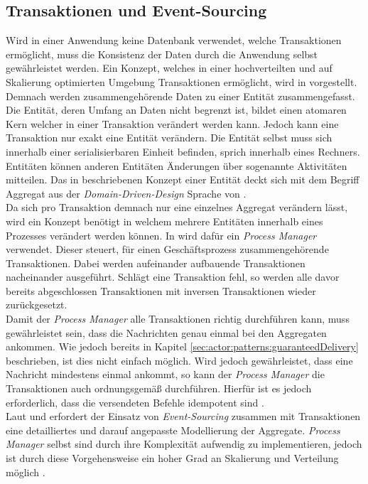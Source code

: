 \subsection{Transaktionen und Event-Sourcing}
Wird in einer Anwendung keine Datenbank verwendet, welche Transaktionen ermöglicht, muss die Konsistenz der Daten durch die Anwendung selbst gewährleistet werden. Ein Konzept, welches in einer hochverteilten und auf Skalierung optimierten Umgebung Transaktionen ermöglicht, wird in \cite{helland2007life} vorgestellt. Demnach werden zusammengehörende Daten zu einer Entität zusammengefasst. Die Entität, deren Umfang an Daten nicht begrenzt ist, bildet einen atomaren Kern welcher in einer Transaktion verändert werden kann. Jedoch kann eine Transaktion nur exakt eine Entität verändern. Die Entität selbst muss sich innerhalb einer serialisierbaren Einheit befinden, sprich innerhalb eines Rechners. Entitäten können anderen Entitäten Änderungen über sogenannte Aktivitäten mitteilen. Das in \cite{helland2007life} beschriebenen Konzept einer Entität deckt sich mit dem Begriff Aggregat aus der \textit{Domain-Driven-Design} Sprache von \cite{Evans2004Domain-drivenSoftware}. \\
Da sich pro Transaktion demnach nur eine einzelnes Aggregat verändern lässt, wird ein Konzept benötigt in welchem mehrere Entitäten innerhalb eines Prozesses verändert werden können. In \cite{betts2013CQRSEventSourcing} wird dafür ein \textit{Process Manager} verwendet. Dieser steuert, für einen Geschäftsprozess zusammengehörende Transaktionen. Dabei werden aufeinander aufbauende Transaktionen nacheinander ausgeführt. Schlägt eine Transaktion fehl, so werden alle davor bereits abgeschlossen Transaktionen mit inversen Transaktionen wieder zurückgesetzt. \\
Damit der \textit{Process Manager} alle Transaktionen richtig durchführen kann, muss gewährleistet sein, dass die Nachrichten genau einmal bei den Aggregaten ankommen. Wie jedoch bereits in Kapitel \ref{sec:actor:patterns:guaranteedDelivery} beschrieben, ist dies nicht einfach möglich. Wird jedoch gewährleistet, dass eine Nachricht mindestens einmal ankommt, so kann der \textit{Process Manager} die Transaktionen auch ordnungsgemäß durchführen. Hierfür ist es jedoch erforderlich, dass die versendeten Befehle idempotent sind \citep{betts2013CQRSEventSourcing}.\\
Laut \cite{betts2013CQRSEventSourcing} und \cite{vernon2013implementing} erfordert der Einsatz von \textit{Event-Sourcing} zusammen mit Transaktionen eine detailliertes und darauf angepasste Modellierung der Aggregate. \textit{Process Manager} selbst sind durch ihre Komplexität aufwendig zu implementieren, jedoch ist durch diese Vorgehensweise ein hoher Grad an Skalierung und Verteilung möglich \citep{helland2007life}.